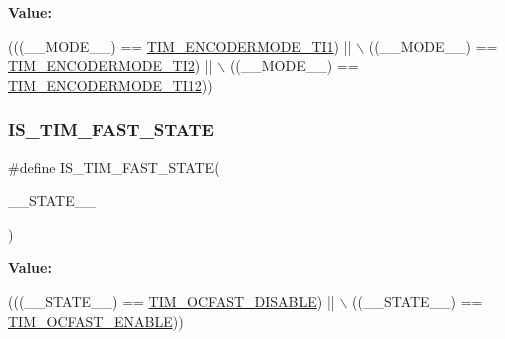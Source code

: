 {\bfseries Value\+:}
\begin{DoxyCode}
(((\_\_MODE\_\_) == \hyperlink{group___t_i_m___encoder___mode_gaff047abefa78b0f0a7bbd0f648905d7d}{TIM\_ENCODERMODE\_TI1}) || \(\backslash\)
                                            ((\_\_MODE\_\_) == \hyperlink{group___t_i_m___encoder___mode_ga9166e985a35358cb3ed942c2a36e018d}{TIM\_ENCODERMODE\_TI2}) || \(\backslash\)
                                            ((\_\_MODE\_\_) == \hyperlink{group___t_i_m___encoder___mode_ga8046f1021dc578551fcff88891239e67}{TIM\_ENCODERMODE\_TI12}))
\end{DoxyCode}
\mbox{\label{group___t_i_m___private___macros_gaf65dbc2ef5f94e76d3a68bf71829760e}} 
\subsubsection{\texorpdfstring{I\+S\+\_\+\+T\+I\+M\+\_\+\+F\+A\+S\+T\+\_\+\+S\+T\+A\+TE}{IS\_TIM\_FAST\_STATE}}
{\footnotesize\ttfamily \#define I\+S\+\_\+\+T\+I\+M\+\_\+\+F\+A\+S\+T\+\_\+\+S\+T\+A\+TE(\begin{DoxyParamCaption}\item[{}]{\+\_\+\+\_\+\+S\+T\+A\+T\+E\+\_\+\+\_\+ }\end{DoxyParamCaption})}

{\bfseries Value\+:}
\begin{DoxyCode}
(((\_\_STATE\_\_) == \hyperlink{group___t_i_m___output___fast___state_ga71429b63f2a6604171ccfd3a91ccf43a}{TIM\_OCFAST\_DISABLE}) || \(\backslash\)
                                            ((\_\_STATE\_\_) == \hyperlink{group___t_i_m___output___fast___state_ga445a2c0633ac649e816cf7a16b716d61}{TIM\_OCFAST\_ENABLE}))
\end{DoxyCode}
\mbox{\label{group___t_i_m___private___macros_ga346707dd1b0915436ca3f58dcfbef3d5}} 
